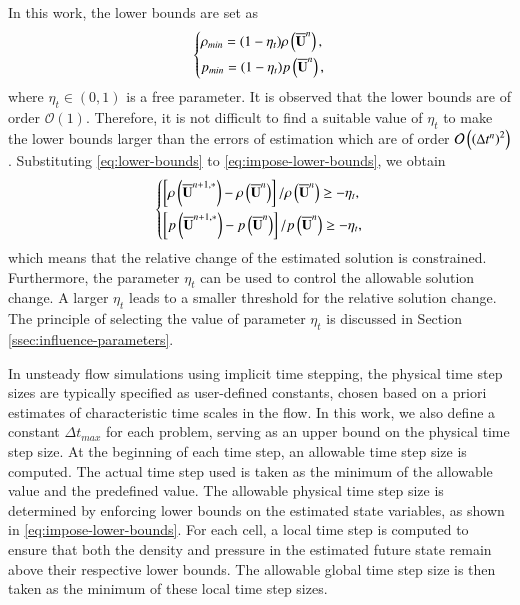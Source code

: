 In this work, the lower bounds are set as 
\begin{equation}
\label{eq:lower-bounds}
    \begin{dcases}
        \rho_{min}= (1-\eta_t) \rho \left(\overline{\mathbf{U}}^n\right), \\
        p_{min}= (1-\eta_t) p \left(\overline{\mathbf{U}}^n\right),
    \end{dcases}
\end{equation}
where $\eta_t \in (0,1)$ is a free parameter. It is observed that 
the lower bounds are of order $\mathcal{O}\left(1\right)$. Therefore,
it is not difficult to find a suitable value of $\eta_t$ to make the lower bounds larger than the errors of estimation which are of order $\mathcal{O}\left(\left(\mathrm\Delta t^n\right)^2\right)$. Substituting \eqref{eq:lower-bounds} to \eqref{eq:impose-lower-bounds}, we obtain
\begin{equation}
    \begin{dcases}
        \left[\rho \left(\overline{\mathbf{U}}^{n+1,*}\right)- \rho \left(\overline{\mathbf{U}}^n\right)\right]/\rho \left(\overline{\mathbf{U}}^n\right) \geq -\eta_t , \\
        \left[p \left(\overline{\mathbf{U}}^{n+1,*}\right)- p \left(\overline{\mathbf{U}}^n\right)\right]/p \left(\overline{\mathbf{U}}^n\right) \geq -\eta_t ,
    \end{dcases}
\end{equation}
which means that the relative change of the estimated solution is constrained. Furthermore, the parameter $\eta_t$ can be used to control the allowable solution change. A larger $\eta_t$ leads to a smaller threshold for the relative solution change. The principle of selecting the value of parameter $\eta_t$ is discussed in Section \ref{ssec:influence-parameters}.

In unsteady flow simulations using implicit time stepping, the physical time step sizes are typically specified as user-defined constants, chosen based on a priori estimates of characteristic time scales in the flow. 
In this work, we also define a constant $\Delta t_{max}$ for each problem, serving as an upper bound on the physical time step size. At the beginning of each time step, an allowable time step size is computed. The actual time step used is taken as the minimum of the allowable value and the predefined value.
The allowable physical time step size is determined by enforcing lower bounds on the estimated state variables, as shown in \eqref{eq:impose-lower-bounds}. For each cell, a local time step is computed to ensure that both the density and pressure in the estimated future state remain above their respective lower bounds. The allowable global time step size is then taken as the minimum of these local time step sizes.


